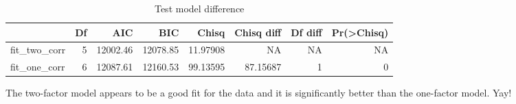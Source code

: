 \documentclass[
]{article}
\begin{document}
\begin{table}[H]

\caption{\label{tab:unnamed-chunk-10}Test model difference}
\centering
\fontsize{12}{14}\selectfont
\begin{tabular}[t]{lrrrrrrr}
\toprule
  & Df & AIC & BIC & Chisq & Chisq diff & Df diff & Pr(>Chisq)\\
\midrule
fit\_two\_corr & 5 & 12002.46 & 12078.85 & 11.97908 & NA & NA & NA\\
fit\_one\_corr & 6 & 12087.61 & 12160.53 & 99.13595 & 87.15687 & 1 & 0\\
\bottomrule
\end{tabular}
\end{table}

The two-factor model appears to be a good fit for the data and it is
significantly better than the one-factor model. Yay!
\end{document}
